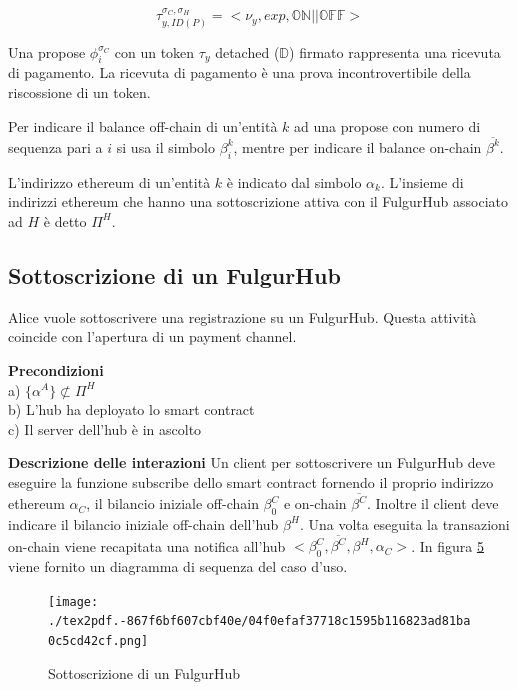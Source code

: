 \documentclass[12pt,italian,]{book}
\begin{document}
\begin{equation}
\label{Un esempio di token}
\tau^{\sigma_C,\sigma_H}_{y, ID(P)} = <\nu_y, exp, \mathbb{ON} || \mathbb{OFF}>
\end{equation}

Una propose \(\phi^{\sigma_C}_i\) con un token \(\tau_y\) detached (\(\mathbb{D}\)) firmato rappresenta una ricevuta di pagamento. La ricevuta di pagamento è una prova incontrovertibile della riscossione di un token.

Per indicare il balance off-chain di un'entità \(k\) ad una propose con numero di sequenza pari a \(i\) si usa il simbolo \(\beta^k_i\), mentre per indicare il balance on-chain \(\overline{\beta^k}\).

L'indirizzo ethereum di un'entità \(k\) è indicato dal simbolo \(\alpha_k\). L'insieme di indirizzi ethereum che hanno una sottoscrizione attiva con il FulgurHub associato ad \(H\) è detto \(\Pi^H\).

\hypertarget{sottoscrizione-di-un-fulgurhub}{%
\subsection{Sottoscrizione di un FulgurHub}\label{sottoscrizione-di-un-fulgurhub}}

Alice vuole sottoscrivere una registrazione su un FulgurHub. Questa attività coincide con l'apertura di un payment channel.

\textbf{\textbf{Precondizioni}}\\
a) \(\{\alpha^A\} \not\subset \Pi^H\)\\
b) L'hub ha deployato lo smart contract\\
c) Il server dell'hub è in ascolto

\textbf{\textbf{Descrizione delle interazioni}} Un client per sottoscrivere un FulgurHub deve eseguire la funzione subscribe dello smart contract fornendo il proprio indirizzo ethereum \(\alpha_C\), il bilancio iniziale off-chain \(\beta^C_0\) e on-chain \(\overline{\beta^C}\). Inoltre il client deve indicare il bilancio iniziale off-chain dell'hub \(\beta^H\). Una volta eseguita la transazioni on-chain viene recapitata una notifica all'hub \(<\beta^C_0, \overline{\beta^C}, \beta^H, \alpha_C>\). In figura \protect\hyperlink{sottoscrizione-fulgur-hub}{5} viene fornito un diagramma di sequenza del caso d'uso.

\begin{figure}
\centering
\texttt{[image: ./tex2pdf.-867f6bf607cbf40e/04f0efaf37718c1595b116823ad81ba0c5cd42cf.png]}
\caption{\protect\hypertarget{sottoscrizione-fulgur-hub}{}{}Sottoscrizione di un FulgurHub}
\end{figure}
\end{document}
